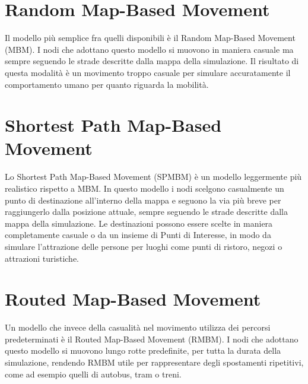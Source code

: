 \section{Random Map-Based Movement}
Il modello più semplice fra quelli disponibili è il Random Map-Based Movement (MBM). I nodi che adottano questo modello si muovono in maniera casuale ma sempre seguendo le strade descritte dalla mappa della simulazione. Il risultato di questa modalità è un movimento troppo casuale per simulare accuratamente il comportamento umano per quanto riguarda la mobilità.

\section{Shortest Path Map-Based Movement}
Lo Shortest Path Map-Based Movement (SPMBM) è un modello leggermente più realistico rispetto a MBM. In questo modello i nodi scelgono casualmente un punto di destinazione all'interno della mappa e seguono la via più breve per raggiungerlo dalla posizione attuale, sempre seguendo le strade descritte dalla mappa della simulazione. Le destinazioni possono essere scelte in maniera completamente casuale o da un insieme di Punti di Interesse, in modo da simulare l'attrazione delle persone per luoghi come punti di ristoro, negozi o attrazioni turistiche.

\section{Routed Map-Based Movement}
Un modello che invece della casualità nel movimento utilizza dei percorsi predeterminati è il Routed Map-Based Movement (RMBM). I nodi che adottano questo modello si muovono lungo rotte predefinite, per tutta la durata della simulazione, rendendo RMBM utile per rappresentare degli spostamenti ripetitivi, come ad esempio quelli di autobus, tram o treni.

